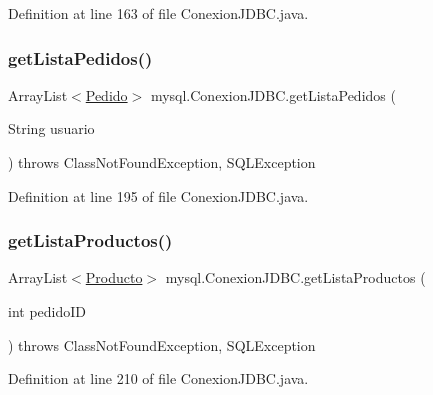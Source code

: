 Definition at line 163 of file Conexion\+J\+D\+B\+C.\+java.

\mbox{\label{classmysql_1_1_conexion_j_d_b_c_a38333a2f31d016faaf14c08901c6ffea}} 
\subsubsection{\texorpdfstring{get\+Lista\+Pedidos()}{getListaPedidos()}}
{\footnotesize\ttfamily Array\+List$<$\mbox{\hyperlink{classobjetos_1_1_pedido}{Pedido}}$>$ mysql.\+Conexion\+J\+D\+B\+C.\+get\+Lista\+Pedidos (\begin{DoxyParamCaption}\item[{String}]{usuario }\end{DoxyParamCaption}) throws Class\+Not\+Found\+Exception, S\+Q\+L\+Exception}



Definition at line 195 of file Conexion\+J\+D\+B\+C.\+java.

\mbox{\label{classmysql_1_1_conexion_j_d_b_c_a93e878bd79640edb42bbaa5e11217f8e}} 
\subsubsection{\texorpdfstring{get\+Lista\+Productos()}{getListaProductos()}}
{\footnotesize\ttfamily Array\+List$<$\mbox{\hyperlink{classobjetos_1_1_producto}{Producto}}$>$ mysql.\+Conexion\+J\+D\+B\+C.\+get\+Lista\+Productos (\begin{DoxyParamCaption}\item[{int}]{pedido\+ID }\end{DoxyParamCaption}) throws Class\+Not\+Found\+Exception, S\+Q\+L\+Exception}



Definition at line 210 of file Conexion\+J\+D\+B\+C.\+java.

\mbox{\label{classmysql_1_1_conexion_j_d_b_c_afa9f004689cee7a90e6a19c359409e04}} 
